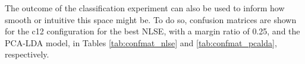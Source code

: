 The outcome of the classification experiment can also be used to inform how smooth or intuitive this space might be.
To do so, confusion matrices are shown for the c12 configuration for the best NLSE, with a margin ratio of 0.25, and the PCA-LDA model, in Tables \ref{tab:confmat_nlse} and \ref{tab:confmat_pcalda}, respectively.



